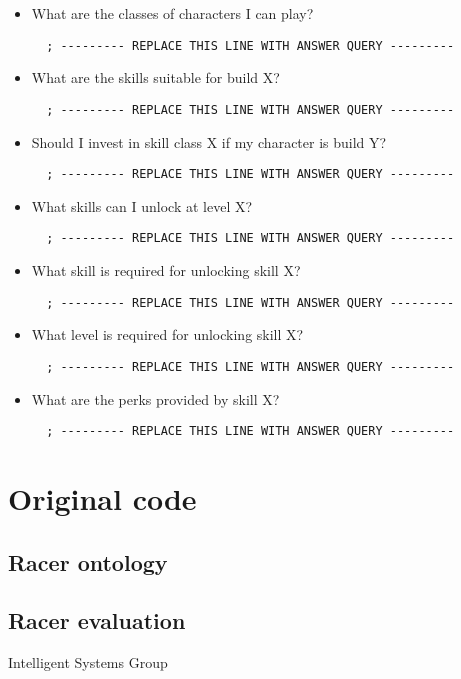 \documentclass[a4paper,12pt]{report}
\begin{document}
\begin{itemize}
  \item What are the classes of characters I can play?
  \begin{lstlisting}
  ; --------- REPLACE THIS LINE WITH ANSWER QUERY ---------
  \end{lstlisting}
  \item What are the skills suitable for build X?
  \begin{lstlisting}
  ; --------- REPLACE THIS LINE WITH ANSWER QUERY ---------
  \end{lstlisting}
  \item Should I invest in skill class X if my character is build Y?
  \begin{lstlisting}
  ; --------- REPLACE THIS LINE WITH ANSWER QUERY ---------
  \end{lstlisting}
  \item What skills can I unlock at level X?
  \begin{lstlisting}
  ; --------- REPLACE THIS LINE WITH ANSWER QUERY ---------
  \end{lstlisting}
  \item What skill is required for unlocking skill X?
  \begin{lstlisting}
  ; --------- REPLACE THIS LINE WITH ANSWER QUERY ---------
  \end{lstlisting}
  \item What level is required for unlocking skill X?
  \begin{lstlisting}
  ; --------- REPLACE THIS LINE WITH ANSWER QUERY ---------
  \end{lstlisting}
  \item What are the perks provided by skill X?
  \begin{lstlisting}
  ; --------- REPLACE THIS LINE WITH ANSWER QUERY ---------
  \end{lstlisting}
\end{itemize}


\clearpage
\appendix

\chapter{Original code}
\section{Racer ontology}



\section{Racer evaluation}




\vspace{2cm}
\begin{center}
Intelligent Systems Group\\
\end{center}
\end{document}
